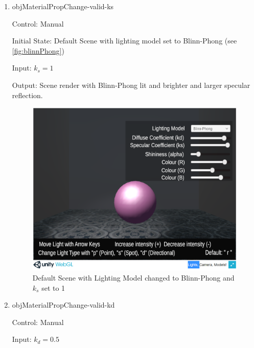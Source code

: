 \documentclass[12pt, titlepage]{article}
\begin{document}
\begin{enumerate}
	\item{objMaterialPropChange-valid-ks\\}
	
	Control: Manual
	
	Initial State: Default Scene with lighting model set to Blinn-Phong (see 
	\ref{fig:blinnPhong})
	
	Input: $k_{s} = 1$
	
	Output: Scene render with Blinn-Phong lit and brighter and larger specular 
	reflection.
	
	\begin{figure}[h]
		\centering
		\includegraphics[scale=0.25]{./images/fromVnVPlan/sphere-lit-blinnphong-ks1}
		\caption{Default Scene with Lighting Model changed to Blinn-Phong and 
			$k_{s}$ set to 1}
		\label{fig:blinnPhong-ks1}
	\end{figure}
	
	
	
	\item{objMaterialPropChange-valid-kd\\}
	
	Control: Manual
	
	Input: $k_{d} = 0.5$
	

\end{enumerate}
\end{document}
